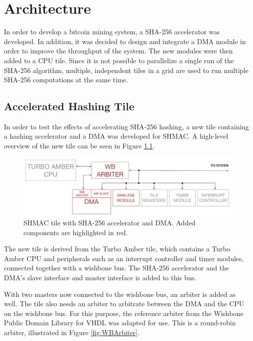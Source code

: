 \chapter{Architecture}
\label{cha:architecture}

In order to develop a bitcoin mining system, a SHA-256 accelerator was developed. In addition,
it was decided to design and integrate a DMA module in order to improve the throughput of
the system. The new modules were then added to a CPU tile. Since it is not possible
to parallelize a single run of the SHA-256 algorithm, multiple, independent tiles
in a grid are used to run multiple SHA-256 computations at the same time.

\section{Accelerated Hashing Tile}
\label{sec:aht}

In order to test the effects of accelerating SHA-256 hashing, a new tile containing a hashing
accelerator and a DMA was developed for SHMAC. A high-level overview of the new tile can be
seen in Figure \ref{fig:SHA-Tile}.

\begin{figure}[htb]
    \centering
    \includegraphics[width=1.0\textwidth]{Figures/Tile/HashingTile}
    \caption{SHMAC tile with SHA-256 accelerator and DMA. Added components are highlighted in red.}
    \label{fig:SHA-Tile}
\end{figure}

The new tile is derived from the Turbo Amber tile, which contains
a Turbo Amber CPU and peripherals such as an interrupt controller and timer modules, connected
together with a wishbone bus.
The SHA-256 accelerator and the DMA's slave interface and master interface is added to this bus.

With two masters now connected to the wishbone bus, an arbiter is added as well.
The tile also needs an arbiter to arbitrate between the DMA and the CPU on the wishbone bus.
For this purpose, the reference arbiter from the Wishbone Public Domain Library for VHDL %
was adapted for use. This is a round-robin arbiter, illustrated in Figure \ref{fig:WBArbiter}.

